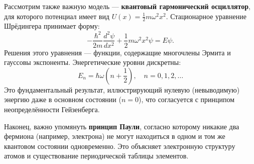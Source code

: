 Рассмотрим также важную модель — \textbf{квантовый гармонический осциллятор}, для которого потенциал имеет вид $U(x) = \frac{1}{2} m \omega^2 x^2$. Стационарное уравнение Шрёдингера принимает форму:
\[
-\frac{\hbar^2}{2m} \frac{d^2 \psi}{dx^2} + \frac{1}{2} m \omega^2 x^2 \psi = E \psi.
\]
Решения этого уравнения — функции, содержащие многочлены Эрмита и гауссовы экспоненты. Энергетические уровни дискретны:
\[
E_n = \hbar \omega \left(n + \frac{1}{2}\right), \quad n = 0, 1, 2, \ldots
\]
Это фундаментальный результат, иллюстрирующий нулевую (невыводимую) энергию даже в основном состоянии ($n = 0$), что согласуется с принципом неопределённости Гейзенберга.

Наконец, важно упомянуть \textbf{принцип Паули}, согласно которому никакие два фермиона (например, электрона) не могут находиться в одном и том же квантовом состоянии одновременно. Это объясняет электронную структуру атомов и существование периодической таблицы элементов.
